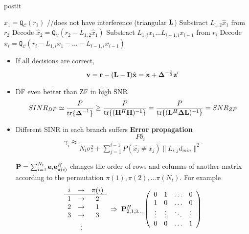 \documentclass[xcolor=dvipsnames,aspectratio=169]{beamer}
\begin{document}
{        \pagebreak

    \begin{beamercolorbox}[wd=\textwidth]{postit}
     \begin{algorithmic}[0]
        \STATE $\hat{x}_1=\texttt{Q}_{\mathcal{C}}(r_1)$ //does not have interference (triangular $\mathbf{L}$)
        \STATE Substract $L_{1,2}\hat{x}_1$ from $r_2$ 
        \STATE Decode $\hat{x}_2=\texttt{Q}_{\mathcal{C}}(r_2-L_{1,2}\hat{x}_1)$
        \STATE Substract $L_{1,i}x_1\dots L_{i-1,i}x_{i-1}$ from $r_i$
        \STATE Decode $\hat{x}_i=\texttt{Q}_{\mathcal{C}}(r_i-L_{1,i}x_1-\dots - L_{i-1,i}x_{i-1})$
        \ENDFOR
     \end{algorithmic}
     \end{beamercolorbox}
     \begin{itemize}
      \item If all decisions are correct, 
         $$\mathbf{v}=\mathbf{r}-(\mathbf{L}-\mathbf{I})\hat{\mathbf{x}}=\mathbf{x}+\mathbf{\boldsymbol{\Delta}}^{-\frac{1}{2}}\mathbf{z}'$$
        \item DF even better than ZF in high SNR
            $$SINR_{DF}\simeq \frac{P}{\textnormal{tr}\{\mathbf{\boldsymbol{\Delta}}^{-1}\}}\geq\frac{P}{\textnormal{tr}\{(\mathbf{H}^H\mathbf{H})^{-1}\}}=\frac{P}{\textnormal{tr}\{(\mathbf{L}^H\mathbf{\boldsymbol{\Delta}}\mathbf{L})^{-1}\}}=SNR_{ZF}$$
     \end{itemize}

\pagebreak

\begin{itemize}
 \item Different SINR in each branch suffers \textbf{Error propagation}
 $$\gamma_i\approx\frac{P\delta_i}{N_t\sigma_z^2+\sum_{j=1}^{i-1}P(\hat{x_j}\neq x_j)\|L_{i,j}d_{min}\|^2}$$
 \begin{definition}
  $\mathbf{P}=\sum_{i=1}^{N_t}\mathbf{e}_i\mathbf{e}_{\pi(i)}^H$ changes the order of rows and columns of another matrix according to the permutation $\pi(1),\pi(2),\dots \pi(N_t)$. For example
   $$\begin{array}{ccc}i&\to&\pi(i)\\\hline
      1&\to&2\\
      2&\to&1\\
      3&\to&3\\
      &\vdots&\\
     \end{array}\;\Rightarrow\;
\mathbf{P}_{2,1,3\dots}^H\left(\begin{array}{cccc}
             0 & 1 & \dots & 0\\
             1 & 0 & \dots & 0\\
             \vdots & \vdots & \ddots & \vdots\\
             0 & 0 & \dots & 1\\
            \end{array}\right)$$
 \end{definition}
\end{itemize}

}
\end{document}

